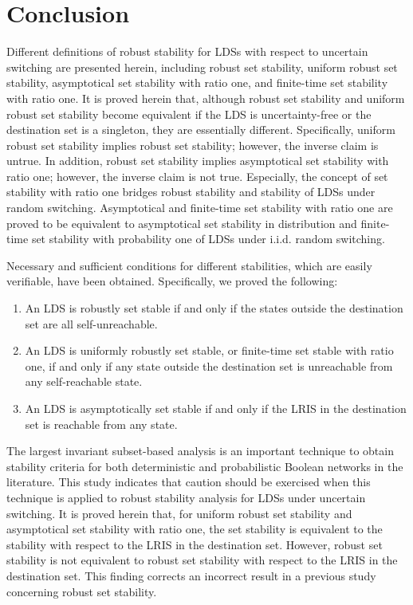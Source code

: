 \documentclass[11pt,onecolumn]{article}
\begin{document}
\section{Conclusion}\label{SectionConcluding}

Different definitions of robust stability for LDSs with respect to uncertain switching are presented herein, including robust set stability, uniform robust set stability, asymptotical set stability with ratio one, and finite-time set stability with ratio one.  It is proved herein that, although robust set stability and uniform robust set stability become equivalent if the LDS is uncertainty-free or the destination set is a singleton, they are essentially different. Specifically, uniform robust set stability implies robust set stability; however, the inverse claim is untrue. In addition, robust set stability implies asymptotical set stability with ratio one; however, the inverse claim is not true. Especially, the concept of set stability with ratio one bridges robust stability and stability of LDSs under random switching. Asymptotical and finite-time set stability with ratio one are proved to be equivalent to asymptotical set stability in distribution and finite-time set stability with probability one of LDSs under i.i.d. random switching.

 Necessary and sufficient conditions for different stabilities, which are easily verifiable, have been obtained.  Specifically, we proved the following:
 \begin{enumerate}
   \item An LDS is robustly set stable if and only if the states outside the destination set are all self-unreachable.
   \item An LDS is uniformly robustly set stable, or finite-time set stable with ratio one, if and only if any state outside the destination set is unreachable from any self-reachable state.
   \item An LDS is asymptotically set stable if and only if the LRIS in the destination set is reachable from any state.
 \end{enumerate}


 The largest invariant subset-based analysis is an important technique to obtain stability criteria for both deterministic and probabilistic Boolean networks in the literature. This study indicates that caution should be exercised when this technique is applied to robust stability analysis for LDSs under uncertain switching. It is proved herein that, for uniform robust set stability and asymptotical set stability with ratio one, the set stability is equivalent to the stability with respect to the LRIS in the destination set. However, robust set stability is not equivalent to robust set stability with respect to the LRIS in the destination set. This finding corrects an incorrect result in a previous study \cite{Guo2017Invariant} concerning robust set stability.
\end{document}
